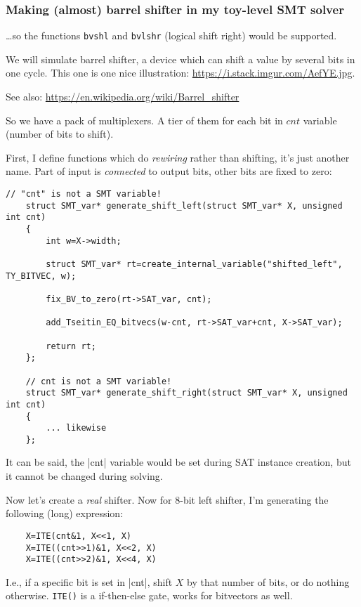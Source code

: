 \subsubsection{Making (almost) barrel shifter in my toy-level SMT solver}

\dots so the functions \verb|bvshl| and \verb|bvlshr| (logical shift right) would be supported.

We will simulate barrel shifter, a device which can shift a value by several bits in one cycle.
This one is one nice illustration:
\url{https://i.stack.imgur.com/AefYE.jpg}.


See also: \url{https://en.wikipedia.org/wiki/Barrel_shifter}

So we have a pack of multiplexers. A tier of them for each bit in $cnt$ variable (number of bits to shift).

First, I define functions which do \textit{rewiring} rather than shifting, it's just another name.
Part of input is \textit{connected} to output bits, other bits are fixed to zero:

\begin{lstlisting}[style=customc]
	// "cnt" is not a SMT variable!
	struct SMT_var* generate_shift_left(struct SMT_var* X, unsigned int cnt)
	{
		int w=X->width;

		struct SMT_var* rt=create_internal_variable("shifted_left", TY_BITVEC, w);

		fix_BV_to_zero(rt->SAT_var, cnt);

		add_Tseitin_EQ_bitvecs(w-cnt, rt->SAT_var+cnt, X->SAT_var);

		return rt;
	};

	// cnt is not a SMT variable!
	struct SMT_var* generate_shift_right(struct SMT_var* X, unsigned int cnt)
	{
		... likewise
	};
\end{lstlisting}

It can be said, the |cnt| variable would be set during SAT instance creation, but it cannot be changed during solving.

Now let's create a \textit{real} shifter.
Now for 8-bit left shifter, I'm generating the following (long) expression:

\begin{lstlisting}
	X=ITE(cnt&1, X<<1, X)
	X=ITE((cnt>>1)&1, X<<2, X)
	X=ITE((cnt>>2)&1, X<<4, X)
\end{lstlisting}

I.e., if a specific bit is set in |cnt|, shift $X$ by that number of bits, or do nothing otherwise.
\verb|ITE()| is a if-then-else gate, works for bitvectors as well.

